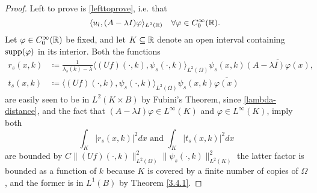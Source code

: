 \begin{theorem}
\begin{proof}
		Left to prove is \eqref{lefttoprove}, i.e. that
			\begin{equation}
				\langle u_{l} , (A - \lambda I) \varphi \rangle_{L^{2}(\R)} \quad \forall \varphi \in C^{\infty}_{0}(\R). \label{lefttoshow2}
			\end{equation} 
		Let $\varphi \in C_{0}^{\infty}(\mathbb{R})$ be fixed, and let $K \subseteq \mathbb{R}$ denote an open interval containing $\operatorname{supp}(\varphi)$ in its interior. Both the functions
		\begin{align*}
			r_{s}(x, k) & \coloneqq \frac{1}{\lambda_{s}(k) - \lambda} \langle (Uf)(\cdot, k), \psi_{s}(\cdot, k) \rangle_{L^{2}(\Omega)} \psi_{s}(x, k) \overline{(A - \lambda I) \varphi(x)}, \\
			t_{s}(x, k) & \coloneqq \langle (Uf)(\cdot, k), \psi_{s}(\cdot, k) \rangle_{L^{2}(\Omega)} \psi_{s}(x, k) \overline{\varphi(x)}
		\end{align*}
		are easily seen to be in $L^{2}(K \times B)$ by Fubini's Theorem, since \eqref{lambda-distance}, and the fact that $(A - \lambda I) \varphi \in L^{\infty}(K)$ and $\varphi \in L^{\infty}(K)$, imply both
		\[ \int_{K} |r_{s}(x, k)|^{2} dx \text{ and } \int_{K} |t_{s}(x, k)|^{2} dx \]
		are bounded by $C \| (Uf)(\cdot, k) \|^{2}_{L^{2}(\Omega)} \| \psi_{s}(\cdot, k) \|^{2}_{L^{2}(K)}$ the latter factor is bounded as a function of $k$ because $K$ is covered by a finite number of copies of $\Omega$, and the former is in $L^{1}(B)$ by Theorem \ref{3.4.1}.
		

\end{proof}
\end{theorem}
